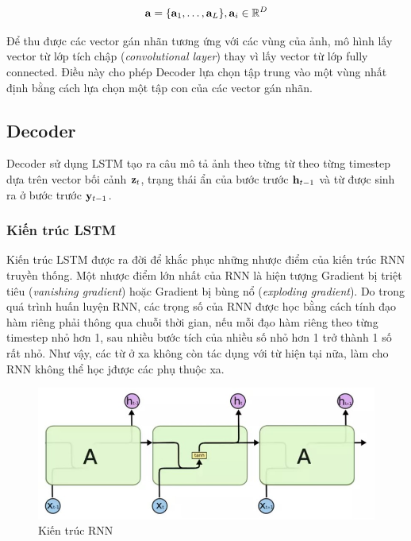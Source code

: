 \documentclass[14pt, a4paper]{article}
\numberwithin{equation}{section}
\numberwithin{algorithm}{section}
\numberwithin{figure}{section}
\numberwithin{table}{section}
\numberwithin{dl}{section}
\numberwithin{md}{section}
\numberwithin{bd}{section}
\numberwithin{dn}{section}
\numberwithin{hq}{section}
\begin{document}
    \begin{equation}
        \bold{a}=\lbrace \bold{a}_1, \dots, \bold{a}_L \rbrace, \bold{a}_i \in \mathbb{R}^D
    \end{equation}

    Để thu được các vector gán nhãn tương ứng với các vùng của ảnh, mô hình lấy vector từ lớp tích chập (\textit{convolutional layer}) thay vì lấy vector từ lớp fully connected.
    Điều này cho phép Decoder lựa chọn tập trung vào một vùng nhất định bằng cách lựa chọn một tập con của các vector gán nhãn.

    \subsection{Decoder}

    Decoder sử dụng LSTM \cite{hochreiter1997long} tạo ra câu mô tả ảnh theo từng từ theo từng timestep dựa trên vector bối cảnh $\bold{z}_t$, trạng thái ẩn của bước trước $\bold{h}_{t-1}$ và từ được sinh ra ở bước trước $\bold{y}_{t-1}$.

    \subsubsection{Kiến trúc LSTM}

    Kiến trúc LSTM được ra đời để khắc phục những nhược điểm của kiến trúc RNN truyền thống.
    Một nhược điểm lớn nhất của RNN là hiện tượng Gradient bị triệt tiêu (\textit{vanishing gradient}) hoặc Gradient bị bùng nổ (\textit{exploding gradient}).
    Do trong quá trình huấn luyện RNN, các trọng số của RNN được học bằng cách tính đạo hàm riêng phải thông qua chuỗi thời gian, nếu mỗi đạo hàm riêng theo từng timestep nhỏ hơn 1, sau nhiều bước tích của nhiều số nhỏ hơn 1 trở thành 1 số rất nhỏ.
    Như vậy, các từ ở xa không còn tác dụng với từ hiện tại nữa, làm cho RNN không thể học jđược các phụ thuộc xa.


    \begin{figure}[h!] \centering

        \includegraphics[scale=0.9]{RNN_Sequence.jpg}
        \caption{Kiến trúc RNN}
    
        \label{fig:RNN_Sequence}
    \end{figure}
\end{document}
